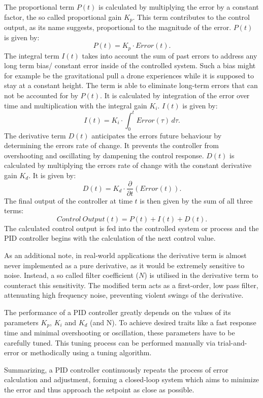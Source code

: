 The proportional term $P(t)$ is calculated by multiplying the error by a constant factor, the so called proportional gain $K_p$.
This term contributes to the control output, as its name suggests, proportional to the magnitude of the error.
$P(t)$ is given by:
\[
	P(t) = K_p \cdot Error(t)
.\]
The integral term $I(t)$ takes into account the sum of past errors to address any long term bias/ constant error inside of the controlled system.
Such a bias might for example be the gravitational pull a drone experiences while it is supposed to stay at a constant height.
The term is able to eliminate long-term errors that can not be accounted for by $P(t)$.
It is calculated by integration of the error over time and multiplication with the integral gain $K_i$.
$I(t)$ is given by:
\[
	I(t) = K_i \cdot \int_{0}^{t} Error(\tau) \,d\tau
.\]
The derivative term $D(t)$ anticipates the errors future behaviour by determining the errors rate of change.
It prevents the controller from overshooting and oscillating by dampening the control response.
$D(t)$ is calculated by multiplying the errors rate of change with the constant derivative gain $K_d$.
It is given by:
\[
	D(t) = K_d \cdot \frac{\partial}{\partial t}(Error(t))
.\]
The final output of the controller at time $t$ is then given by the sum of all three terms:
\[
	Control\ Output(t) = P(t) + I(t) + D(t)
.\]
The calculated control output is fed into the controlled system or process and the PID controller begins with the calculation of the next control value.

As an additional note, in real-world applications the derivative term is almost never implemented as a pure derivative, as it would be extremely sensitive to noise.
Instead, a so called filter coefficient ($N$) is utilised in the derivative term to counteract this sensitivity.
The modified term acts as a first-order, low pass filter, attenuating high frequency noise, preventing violent swings of the derivative.

The performance of a PID controller greatly depends on the values of its parameters $K_p$, $K_i$ and $K_d$ (and N).
To achieve desired traits like a fast response time and minimal overshooting or oscillation, these parameters have to be carefully tuned. 
This tuning process can be performed manually via trial-and-error or methodically using a tuning algorithm.

Summarizing, a PID controller continuously repeats the process of error calculation and adjustment, forming a closed-loop system which aims to minimize the error and thus approach the setpoint as close as possible.



